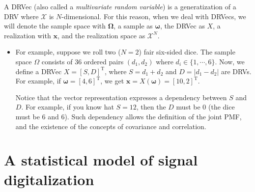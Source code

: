 A \gls{DRVec} (also called a \emph{multivariate random variable}) is a
generatization of a \gls{DRV} where $\mathcal{X}$ is
$N$-dimensional. For this reason, when we deal with \glspl{DRVec}, we
will denote the sample space with $\bm{\Omega}$, a sample as
$\bm{\omega}$, the \gls{DRVec} as $X$, a realization with $\bm{x}$,
and the realization space as $\mathcal{X}^N$.

\begin{itemize}
\item For example, suppose we roll two ($N=2$) fair six-sided
  dice. The sample space $\Omega$ consists of 36 ordered pairs
  $(d_1,d_2)$ where $d_i\in\{1,\cdots,6\}$. Now, we define a
  \gls{DRVec} $X=[S,D]^{\text{T}}$, where $S=d_1 + d_2$ and
  $D=|d_1-d_2|$ are \glspl{DRV}. For example, if
  $\bm{\omega}=[4,6]^{\text{T}}$, we get
  $\bm{x}=X(\bm{\omega})=[10,2]^{\text{T}}$.
  
  Notice that the vector representation expresses a dependency between
  $S$ and $D$. For example, if you know hat $S=12$, then the $D$ must
  be 0 (the dice must be 6 and 6). Such dependency allows the
  definition of the joint \gls{PMF}, and the existence of the concepts
  of covariance and correlation.
\end{itemize}


\section{A statistical model of signal digitalization}


